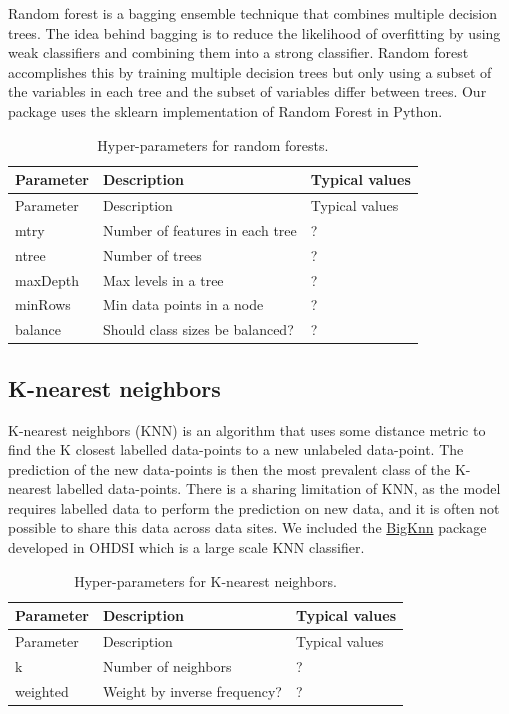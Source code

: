 \documentclass[11pt]{book}
\theoremstyle{definition}
\theoremstyle{definition}
\theoremstyle{definition}
\theoremstyle{remark}
\begin{document}
Random forest is a bagging ensemble technique that combines multiple decision trees. The idea behind bagging is to reduce the likelihood of overfitting by using weak classifiers and combining them into a strong classifier. Random forest accomplishes this by training multiple decision trees but only using a subset of the variables in each tree and the subset of variables differ between trees. Our package uses the sklearn implementation of Random Forest in Python.   

\begin{longtable}[]{@{}lll@{}}
\caption{\label{tab:randomForestParameters} Hyper-parameters for random forests.}\tabularnewline
\toprule
Parameter & Description & Typical values\tabularnewline
\midrule
\endfirsthead
\toprule
Parameter & Description & Typical values\tabularnewline
\midrule
\endhead
mtry & Number of features in each tree & ?\tabularnewline
ntree & Number of trees & ?\tabularnewline
maxDepth & Max levels in a tree & ?\tabularnewline
minRows & Min data points in a node & ?\tabularnewline
balance & Should class sizes be balanced? & ?\tabularnewline
\bottomrule
\end{longtable}

\hypertarget{k-nearest-neighbors}{%
\subsection{K-nearest neighbors}\label{k-nearest-neighbors}}

K-nearest neighbors (KNN) is an algorithm that uses some distance metric to find the K closest labelled data-points to a new unlabeled data-point. The prediction of the new data-points is then the most prevalent class of the K-nearest labelled data-points. There is a sharing limitation of KNN, as the model requires labelled data to perform the prediction on new data, and it is often not possible to share this data across data sites. We included the \href{https://github.com/OHDSI/BigKnn}{BigKnn} package developed in OHDSI which is a large scale KNN classifier.  

\begin{longtable}[]{@{}lll@{}}
\caption{\label{tab:knnParameters} Hyper-parameters for K-nearest neighbors.}\tabularnewline
\toprule
Parameter & Description & Typical values\tabularnewline
\midrule
\endfirsthead
\toprule
Parameter & Description & Typical values\tabularnewline
\midrule
\endhead
k & Number of neighbors & ?\tabularnewline
weighted & Weight by inverse frequency? & ?\tabularnewline
\bottomrule
\end{longtable}
\end{document}
